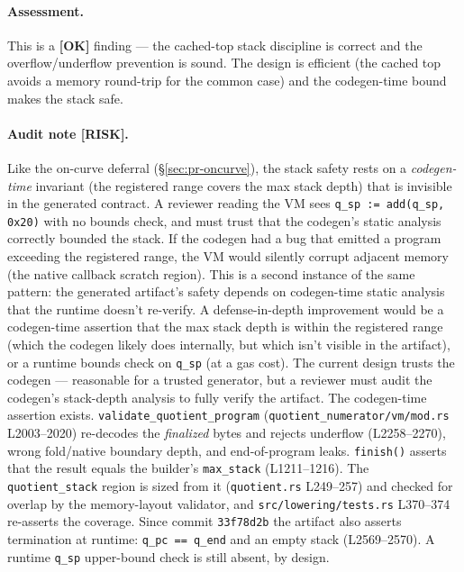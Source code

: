 \paragraph{Assessment.} This is a
\textcolor{tracegreen}{\textbf{[OK]}} finding --- the cached-top
stack discipline is correct and the overflow/underflow prevention
is sound. The design is efficient (the cached top avoids a memory
round-trip for the common case) and the codegen-time bound makes
the stack safe.

\paragraph{Audit note [RISK].} Like the on-curve deferral
(\S\ref{sec:pr-oncurve}), the stack safety rests on a
\emph{codegen-time} invariant (the registered range covers the
max stack depth) that is invisible in the generated contract. A
reviewer reading the VM sees \texttt{q\_\allowbreak{}sp := add(q\_\allowbreak{}sp, 0x20)}
with no bounds check, and must trust that the codegen's static
analysis correctly bounded the stack. If the codegen had a bug
that emitted a program exceeding the registered range, the VM
would silently corrupt adjacent memory (the native callback
scratch region). This is a second instance of the same pattern:
the generated artifact's safety depends on codegen-time static
analysis that the runtime doesn't re-verify. A defense-in-depth
improvement would be a codegen-time assertion that the max stack
depth is within the registered range (which the codegen likely
does internally, but which isn't visible in the artifact), or a
runtime bounds check on \texttt{q\_sp} (at a gas cost). The
current design trusts the codegen --- reasonable for a trusted
generator, but a reviewer must audit the codegen's stack-depth
analysis to fully verify the artifact.  The
codegen-time assertion exists. \texttt{validate\_\allowbreak{}quotient\_\allowbreak{}program}
(\texttt{quotient\_\allowbreak{}numerator/\allowbreak{}vm/\allowbreak{}mod.rs} L2003--2020) re-decodes the
\emph{finalized} bytes and rejects underflow (L2258--2270), wrong
fold/native boundary depth, and end-of-program leaks.
\texttt{finish()} asserts that the result equals the builder's
\texttt{max\_stack} (L1211--1216). The \texttt{quotient\_stack}
region is sized from it (\texttt{quotient.rs} L249--257) and checked
for overlap by the memory-layout validator, and
\texttt{src/\allowbreak{}lowering/\allowbreak{}tests.rs} L370--374 re-asserts the coverage.
Since commit \texttt{33f78d2b} the artifact also asserts termination
at runtime: \texttt{q\_pc == q\_end} and an empty stack (L2569--2570).
 A runtime \texttt{q\_sp} upper-bound check is still
absent, by design.

